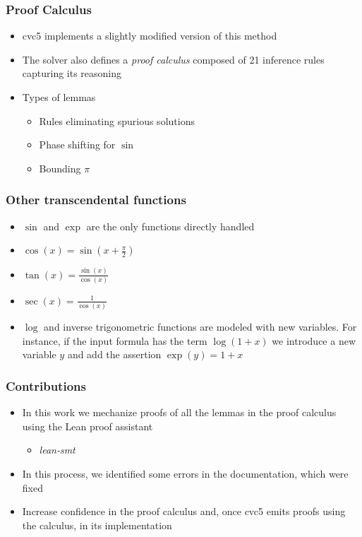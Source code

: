 \documentclass[usepdftitle=false,aspectratio=169,usenames,dvipsnames]{beamer}
\newcommand\vitem{\vfill\item}
\begin{document}
\begin{frame}
  \frametitle{Proof Calculus}
  \begin{itemize}
    \item cvc5 implements a slightly modified version of this method
    \pause
    \vitem The solver also defines a \textit{proof calculus} composed of 21 inference rules capturing its reasoning
    \pause
    \vitem Types of lemmas
         \begin{itemize}
                 \item Rules eliminating spurious solutions
                 \item Phase shifting for $\sin$
                 \item Bounding $\pi$
         \end{itemize}
  \end{itemize}
\end{frame}

\begin{frame}
  \frametitle{Other transcendental functions}
  \begin{itemize}
    \item $\sin$ and $\exp$ are the only functions directly handled
    \pause
    \vitem $\cos(x) = \sin(x + \frac{\pi}{2})$
    \pause
    \vitem $\tan(x) = \frac{\sin(x)}{\cos(x)}$
    \pause
    \vitem $\sec(x) = \frac{1}{\cos(x)}$
    \pause
    \vitem $\log$ and inverse trigonometric functions are modeled with new variables. For instance, if the input formula has the term $\log(1 + x)$ we introduce a new variable $y$ and add the assertion $\exp(y) = 1 + x$
  \end{itemize}
\end{frame}

\begin{frame}
  \frametitle{Contributions}
  \begin{itemize}
    \item In this work we mechanize proofs of all the lemmas in the proof calculus using the Lean proof assistant
          \begin{itemize}
                  \item \textit{lean-smt}
          \end{itemize}
    \pause
    \vitem In this process, we identified some errors in the documentation, which were fixed
    \pause
    \vitem Increase confidence in the proof calculus and, once cvc5 emits proofs using the calculus, in its implementation
  \end{itemize}
\end{frame}
\end{document}
